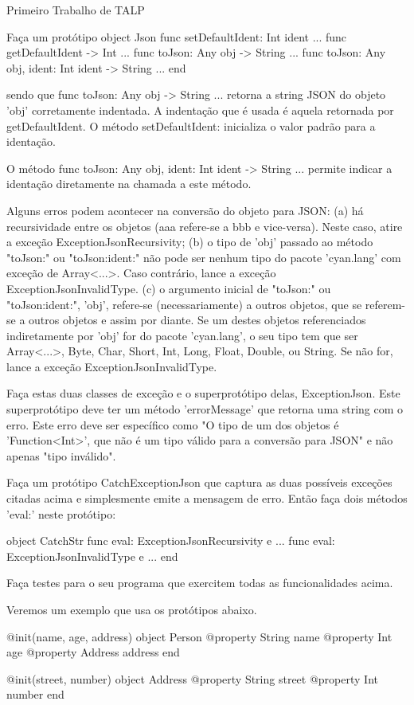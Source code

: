 Primeiro Trabalho de TALP

Faça um protótipo
  object Json
      func setDefaultIdent: Int ident { ... }
      func getDefaultIdent -> Int { ... }
      func toJson: Any obj -> String { ... }
      func toJson: Any obj,
           ident:  Int ident -> String { ... }
  end

sendo que
      func toJson: Any obj -> String { ... }
retorna a string JSON do objeto 'obj' corretamente
indentada.
A indentação que é usada é aquela retornada por getDefaultIdent. O método
     setDefaultIdent:
inicializa o valor padrão para a identação.


O método
      func toJson: Any obj,
           ident:  Int ident -> String { ... }
permite indicar a identação diretamente na chamada a
este método.

Alguns erros podem acontecer na conversão do
objeto para JSON:
(a) há recursividade entre os objetos (aaa
   refere-se a bbb e vice-versa). Neste caso,
   atire a exceção ExceptionJsonRecursivity;
(b) o tipo de 'obj' passado ao método "toJson:" ou
    "toJson:ident:" não pode ser nenhum tipo do
    pacote 'cyan.lang' com exceção de Array<...>.
    Caso contrário, lance a exceção 
    ExceptionJsonInvalidType.
(c) o argumento inicial de "toJson:" ou "toJson:ident:",
   'obj', refere-se (necessariamente) a outros objetos, que
   se referem-se a outros objetos e assim por diante.
   Se um destes objetos referenciados indiretamente
   por 'obj' for do pacote 'cyan.lang', o seu tipo
   tem que ser Array<...>, Byte, Char, Short, Int, 
   Long, Float, Double, ou String. Se não for, 
   lance a exceção ExceptionJsonInvalidType.


Faça estas duas classes de exceção e o
superprotótipo delas, ExceptionJson. Este
superprotótipo deve ter um método 'errorMessage'
que retorna uma string com o erro. Este erro
deve ser específico como "O tipo de um dos objetos
é 'Function<Int>', que não é um tipo válido para
a conversão para JSON" e não apenas "tipo inválido".

Faça um protótipo CatchExceptionJson que captura
as duas possíveis exceções citadas acima e
simplesmente emite a mensagem de erro. Então
faça dois métodos 'eval:' neste protótipo:

object CatchStr
    func eval: ExceptionJsonRecursivity e {
        ...
    }
    func eval: ExceptionJsonInvalidType e {
        ...
    }
end

Faça testes para o seu programa que exercitem
todas as funcionalidades acima.

Veremos um exemplo que usa os protótipos abaixo.

@init(name, age, address)
object Person
    @property String name
    @property Int age
    @property Address address
end

@init(street, number)
object Address
    @property String street
    @property Int number
end
    


